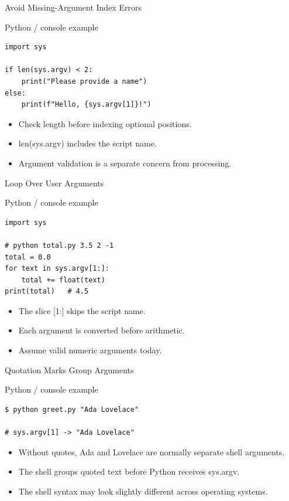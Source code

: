 \documentclass[aspectratio=169,10pt]{beamer}
\begin{document}
\begin{frame}[fragile]{Avoid Missing-Argument Index Errors}
\begin{block}{Python / console example}\begin{Verbatim}[fontsize=\footnotesize]
import sys

if len(sys.argv) < 2:
    print("Please provide a name")
else:
    print(f"Hello, {sys.argv[1]}!")
\end{Verbatim}
\end{block}
\begin{itemize}
\item Check length before indexing optional positions.
\item len(sys.argv) includes the script name.
\item Argument validation is a separate concern from processing.
\end{itemize}
\end{frame}
\begin{frame}[fragile]{Loop Over User Arguments}
\begin{block}{Python / console example}\begin{Verbatim}[fontsize=\footnotesize]
import sys

# python total.py 3.5 2 -1
total = 0.0
for text in sys.argv[1:]:
    total += float(text)
print(total)   # 4.5
\end{Verbatim}
\end{block}
\begin{itemize}
\item The slice [1:] skips the script name.
\item Each argument is converted before arithmetic.
\item Assume valid numeric arguments today.
\end{itemize}
\end{frame}
\begin{frame}[fragile]{Quotation Marks Group Arguments}
\begin{block}{Python / console example}\begin{Verbatim}[fontsize=\footnotesize]
$ python greet.py "Ada Lovelace"

# sys.argv[1] -> "Ada Lovelace"
\end{Verbatim}
\end{block}
\begin{itemize}
\item Without quotes, Ada and Lovelace are normally separate shell arguments.
\item The shell groups quoted text before Python receives sys.argv.
\item The shell syntax may look slightly different across operating systems.
\end{itemize}
\end{frame}
\end{document}
